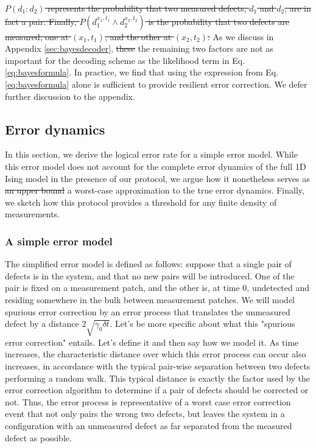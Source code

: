 \documentclass[twocolumn,superscriptaddress,aps,prb,floatfix]{revtex4-1}
\newcommand{\CMH}[1]{{\color{green} { #1}}}
\newcommand{\MS}[1]{{\color{mauve} {#1}}}
\begin{document}
\CMH{\sout{$P(d_1 : d_2)$ represents the probability that two measured defects, $d_1$ and $d_2$, are in fact a pair.  Finally, $P(d_1^{x_1,t_1}\wedge d_2^{x_2,t_2})$ is the probability that two defects are measured, one at $(x_1,t_1)$, and the other at $(x_2,t_2)$.}}  As we discuss in Appendix \ref{sec:bayesdecoder}, \CMH{\sout{these} the remaining two} factors are not as important for the decoding scheme as \MS{the likelihood term} in Eq. \ref{eq:bayesformula}.  In practice, we find that using the expression from Eq. \ref{eq:bayesformula} alone is sufficient to provide resilient error correction.  We defer further discussion to the appendix.
 
 
 \subsection{Error dynamics}
  
  In this section, we derive the \MS{logical} error rate for a simple error model.  While this error model does not account for the complete error dynamics of the full 1D Ising model in the presence of our protocol, we argue how it nonetheless serves as \MS{\sout{an upper bound} a worst-case approximation} to the true error dynamics.  Finally, we sketch how this protocol provides a threshold for any finite density of measurements.
 
 \subsubsection{A simple error model}
 \label{sec:threshold}
 
 The simplified error model is defined as follows:  suppose that a single pair of defects is in the system, and that no new pairs will be introduced.  One of the pair is fixed on a measurement patch, and the other is, at time 0, undetected and residing somewhere in the bulk between measurement patches.  We will model spurious error correction by an error process that translates the unmeasured defect by a distance $2\sqrt{\gamma_0 \delta t}$. \MS{Let's be more specific about what this "spurious error correction" entails. Let's define it and then say how we model it.} As time increases, the characteristic distance over which this error process can occur also increases, in accordance with the typical pair-wise separation between two defects performing a random walk.  This typical distance is exactly the factor used by the error correction algorithm to determine if a pair of defects should be corrected or not.  Thus, the error process is representative of a worst case error correction event that not only pairs the wrong two defects, but leaves the system in a configuration with an unmeasured defect as far separated from the measured defect as possible.
 
\end{document}
